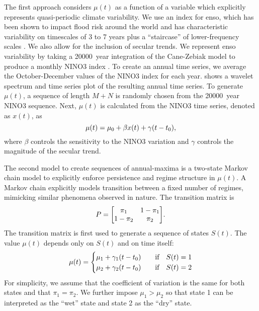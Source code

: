 \documentclass[
  draft,
  linenumbers
]{agujournal2018}
\begin{document}
The first approach considers $\mu(t)$ as a function of a variable which explicitly represents quasi-periodic climate variability.
We use an index for \gls{enso}, which has been shown to impact flood risk around the world \citep{Ropelewski:1987do, Ward:2014gg} and has characteristic variability on timescales of 3 to 7 years \citep{Sarachik:2009dr} plus a ``staircase'' of lower-frequency scales \citep{Jin:1994wq}.
We also allow for the inclusion of secular trends.
We represent \gls{enso} variability by taking a \SI{20000}{year} integration of the Cane-Zebiak model \citep{Zebiak:1987cl} to produce a monthly NINO3 index \citep{Ramesh:2016hf}.
To create an annual time series, we average the October-December values of the NINO3 index for each year.
 shows a wavelet spectrum and time series plot of the resulting annual time series.
To generate $\mu(t)$, a sequence of length $M+N$ is randomly chosen from the \SI{20000}{year} NINO3 sequence.
Next, $\mu(t)$ is calculated from the NINO3 time series, denoted as $x(t)$, as
\begin{equation}\label{eq:nino3}
  \mu(t) = \mu_0 + \beta x(t) + \gamma \qty(t - t_0),
\end{equation}
where $\beta$ controls the sensitivity to the NINO3 variation and $\gamma$ controls the magnitude of the secular trend.

The second model to create sequences of annual-maxima is a two-state Markov chain model to explicitly enforce persistence and regime structure in $\mu(t)$.
A Markov chain explicitly models transition between a fixed number of regimes, mimicking similar phenomena observed in nature.
The transition matrix is
\begin{equation}
  P = \mqty[\pi_1 & 1-\pi_1 \\ 1-\pi_2 & \pi_2].
\end{equation}
The transition matrix is first used to generate a sequence of states $S(t)$.
The value $\mu(t)$ depends only on $S(t)$ and on time itself:
\begin{equation}
  \mu(t) = \begin{cases}
    \mu_{1} + \gamma_1 \qty(t - t_0) & \qqtext{if} S(t) = 1 \\
    \mu_{2} + \gamma_2 \qty(t - t_0) & \qqtext{if} S(t) = 2
  \end{cases}
\end{equation}
For simplicity, we assume that the coefficient of variation is the same for both states and that $\pi_1=\pi_2$.
We further impose $\mu_{1} > \mu_{2}$ so that state 1 can be interpreted as the ``wet'' state and state 2 as the ``dry'' state.
\end{document}
